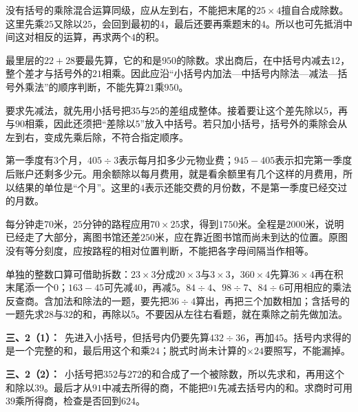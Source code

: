 \documentclass[multi=snippet,border=0pt]{standalone}
\newenvironment{snippet}[3]{\begin{minipage}{#1bp}\color{answerred}\fontsize{#2}{#3}\selectfont\raggedright}{\end{minipage}}
\begin{document}
\begin{snippet}{505}{11.5}{14}没有括号的乘除混合运算同级，应从左到右，不能把末尾的\(25\times4\)擅自合成除数。这里先乘\(25\)又除以\(25\)，会回到最初的\(4\)，最后还要再乘题末的\(4\)。所以也可先抵消中间这对相反的运算，再求两个\(4\)的积。\end{snippet}
\begin{snippet}{505}{11.5}{14}最里层的\(22+28\)要最先算，它的和是\(950\)的除数。求出商后，在中括号内减去\(12\)，整个差才与括号外的\(21\)相乘。因此应沿“小括号内加法—中括号内除法—减法—括号外乘法”的顺序判断，不能先算\(21\)乘\(950\)。\end{snippet}
\begin{snippet}{505}{11.5}{14}要求先减法，就先用小括号把\(35\)与\(25\)的差组成整体。接着要让这个差先除以\(5\)，再与\(90\)相乘，因此还须把“差除以\(5\)”放入中括号。若只加小括号，括号外的乘除会从左到右，变成先乘后除，不符合指定顺序。\end{snippet}
\begin{snippet}{505}{11.5}{14}第一季度有\(3\)个月，\(405\div3\)表示每月扣多少元物业费；\(945-405\)表示扣完第一季度后账户还剩多少元。用余额除以每月费用，就是看余额里有几个这样的月费用，所以结果的单位是“个月”。这里的\(4\)表示还能交费的月份数，不是第一季度已经交过的月数。\end{snippet}
\begin{snippet}{505}{11.5}{14}每分钟走\(70\)米，\(25\)分钟的路程应用\(70\times25\)求，得到\(1750\)米。全程是\(2000\)米，说明已经走了大部分，离图书馆还差\(250\)米，应在靠近图书馆而尚未到达的位置。原图没有等分刻度，应按路程的相对位置判断，不能把各字母间隔当作相等。\end{snippet}
\begin{snippet}{505}{11.5}{14}单独的整数口算可借助拆数：\(23\times3\)分成\(20\times3\)与\(3\times3\)，\(360\times4\)先算\(36\times4\)再在积末尾添一个\(0\)；\(163-45\)可先减\(40\)，再减\(5\)。\(84\div4\)、\(98\div7\)、\(84\div6\)可用相应的乘法反查商。含加法和除法的一题，要先把\(36\div4\)算出，再把三个加数相加；含括号的一题先求\(28\)与\(32\)的和，再除以\(5\)。不要因从左往右看题，就在乘除之前先做加法。\end{snippet}
\begin{snippet}{505}{11.5}{14}\textbf{三、2（1）：}\ 先进入小括号，但括号内仍要先算\(432\div36\)，再加\(45\)。括号内求得的是一个完整的和，最后用这个和乘\(24\)；脱式时尚未计算的\(\times24\)要照写，不能漏掉。\end{snippet}
\begin{snippet}{505}{11.5}{14}\textbf{三、2（2）：}\ 小括号把\(352\)与\(272\)的和合成了一个被除数，所以先求和，再用这个和除以\(39\)。最后才从\(91\)中减去所得的商，不能把\(91\)先减去括号内的和。求商时可用\(39\)乘所得商，检查是否回到\(624\)。\end{snippet}
\end{document}
